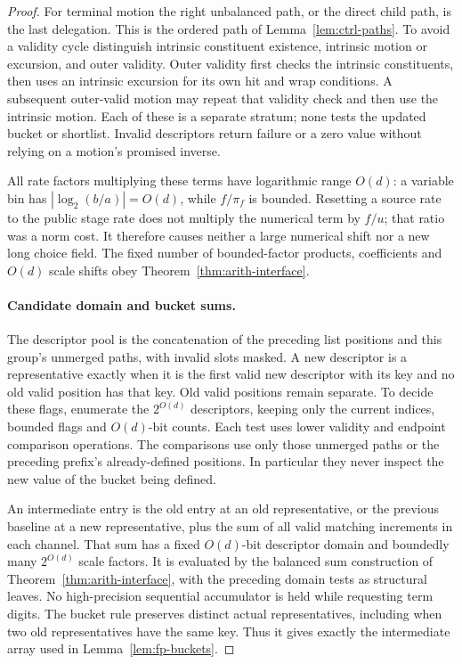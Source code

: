 \begin{proof}
For terminal motion the right unbalanced path, or the direct child
path, is the last delegation.  This is the ordered path of
Lemma~\ref{lem:ctrl-paths}.  To avoid a validity cycle distinguish
intrinsic constituent existence, intrinsic motion or excursion, and
outer validity.  Outer validity first checks the intrinsic constituents,
then uses an intrinsic excursion for its own hit and wrap conditions.
A subsequent outer-valid motion may repeat that validity check and
then use the intrinsic motion.  Each of these is a separate stratum;
none tests the updated bucket or shortlist.  Invalid descriptors return
failure or a zero value without relying on a motion's promised inverse.

All rate factors multiplying these terms have logarithmic range
$O(d)$: a variable bin has $|\log_2(b/a)|=O(d)$, while $f/\pi_f$ is
bounded.  Resetting a source rate to the public stage rate does not
multiply the numerical term by $f/u$; that ratio was a norm cost.
It therefore causes neither a large numerical shift nor a new long
choice field.  The fixed number of bounded-factor products, coefficients
and $O(d)$ scale shifts obey Theorem~\ref{thm:arith-interface}.

\paragraph{Candidate domain and bucket sums.}
The descriptor pool is the concatenation of the preceding list positions
and this group's unmerged paths, with invalid slots masked.  A new
descriptor is a representative exactly when it is the first valid
new descriptor with its key and no old valid position has that key.
Old valid positions remain separate.  To decide these flags, enumerate
the $2^{O(d)}$ descriptors, keeping only the current indices, bounded
flags and $O(d)$-bit counts.  Each test uses lower validity and endpoint
comparison operations.  The comparisons use only those unmerged paths
or the preceding prefix's already-defined positions.  In particular
they never inspect the new value of the bucket being defined.

An intermediate entry is the old entry at an old representative, or
the previous baseline at a new representative, plus the sum of all
valid matching increments in each channel.  That sum has a fixed
$O(d)$-bit descriptor domain and boundedly many $2^{O(d)}$ scale
factors.  It is evaluated by the balanced sum construction of
Theorem~\ref{thm:arith-interface}, with the preceding domain tests as
structural leaves.  No high-precision sequential accumulator is held
while requesting term digits.  The bucket rule preserves distinct
actual representatives, including when two old representatives have
the same key.  Thus it gives exactly the intermediate array used in
Lemma~\ref{lem:fp-buckets}.


\end{proof}
